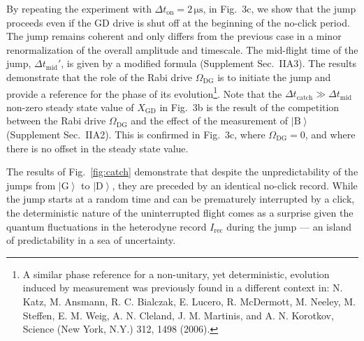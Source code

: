 \documentclass[
	 			preprint,     		superscriptaddress, 																longbibliography,
		amsmath, amssymb,
		aps,  prb,   		floatfix,
		linenumbers     
	]{revtex4-1}
\newcommand{\ket}[1]{\left|#1\right>}
\begin{document}
By repeating the experiment with $\Delta t_\text{on} = 2\, \mathrm{\mu s}$, in Fig.~3c, we show that the jump proceeds even if the GD drive is shut off at the beginning of the no-click period.
The jump remains coherent and only differs from the previous case in a minor renormalization of the overall amplitude and timescale.
The mid-flight time of the jump, $\Delta t_\mathrm{mid}'$, is given by a modified formula (Supplement Sec.~IIA3). 
The results demonstrate that the role of  the Rabi drive $\Omega_\mathrm{DG}$ is to initiate the jump and provide a reference for the phase of its evolution\footnote{
A similar phase reference for a non-unitary, yet deterministic,  evolution induced by measurement was previously found in a different context in: N. Katz, M. Ansmann, R. C. Bialczak, E. Lucero, R. McDermott, M. Neeley, M. Steffen, E. M. Weig, A. N. Cleland, J. M. Martinis, and A. N. Korotkov, Science (New York, N.Y.) 312, 1498 (2006).
}. 
Note that the $\Delta t_\mathrm{catch} \gg \Delta t_\mathrm{mid}$ non-zero steady state value of $X_\mathrm{GD}$ in Fig.~3b is the result of the competition between the Rabi drive $\Omega_\mathrm{DG}$ and the effect of the measurement of $\ket{\mathrm{B}}$ (Supplement Sec.~IIA2).
This is confirmed in Fig.~3c, where $\Omega_\mathrm{DG} = 0$, and where there is no offset in the steady state value.  

The results of Fig.~\ref{fig:catch} demonstrate that despite the unpredictability  of the jumps from $\ket{\mathrm{G}}$ to $\ket{\mathrm{D}}$, they are preceded by an identical no-click record. While the jump starts at a random time and can be prematurely interrupted by a click, the deterministic nature of the uninterrupted flight comes as a surprise given the quantum fluctuations in the heterodyne record $I_\mathrm{rec}$ during the jump --- an island of predictability in a sea of uncertainty. 
\end{document}
